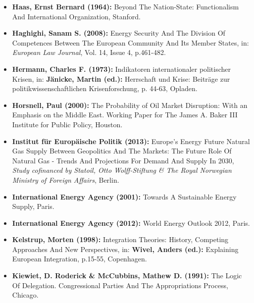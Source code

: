 \documentclass[11pt,a4paper,english]{scrreprt}
\begin{document}
\begin{itemize}
	\item [\Rectsteel] \textbf{Haas, Ernst Bernard (1964):} Beyond The
Nation-State: Functionalism And International Organization, Stanford.



	\item [\Rectsteel] \textbf{Haghighi, Sanam S. (2008):} Energy Security
And The Division Of Competences Between The European Community And Its Member
States, in: \textsl{European Law Journal}, Vol. 14, Issue 4, p.461-482.



	\item [\Rectsteel] \textbf{Hermann, Charles F. (1973):} Indikatoren
internationaler politischer Krisen, in: \textbf{J\"anicke, Martin
(ed.):} Herrschaft und Krise: Beitr\"age zur politikwissenschaftlichen
Krisenforschung, p. 44-63, Opladen.


	\item [\Rectsteel] \textbf{Horsnell, Paul (2000):} The Probability of
Oil Market Disruption: With an Emphasis on the Middle East. Working Paper for
The James A. Baker III Institute for Public Policy, Houston.



	\item [\Rectsteel] \textbf{Institut f\"ur Europ\"aische Politik (2013):}
Europe's Energy Future \textemdash{} Natural Gas Supply Between Geopolitics And
The Markets: The Future Role Of Natural Gas - Trends And Projections For Demand
And Supply In 2030, \textsl{Study cofinanced by Statoil, Otto Wolff-Stiftung \&
The Royal Norwegian Ministry of Foreign Affairs}, Berlin.



	\item [\Rectsteel] \textbf{International Energy Agency (2001):}
Towards A Sustainable Energy Supply, Paris.



	\item [\Rectsteel] \textbf{International Energy Agency (2012):}
World Energy Outlook 2012, Paris.



	\item [\Rectsteel] \textbf{Kelstrup, Morten (1998):} Integration
Theories: History, Competing Approaches And New Perspectives, in:
\textbf{Wivel, Anders (ed.):} Explaining European Integration, p.15-55,
Copenhagen.



	\item [\Rectsteel] \textbf{Kiewiet, D. Roderick \& McCubbins, Mathew D.
(1991):} The Logic Of Delegation. Congressional Parties And The Appropriations
Process, Chicago.




\end{itemize}
\end{document}
